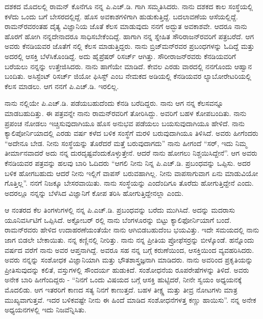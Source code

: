  ದಶಕದ ಮೊದಲಲ್ಲಿ ರಾಮನ್ ಕೊನೆಗೂ ನನ್ನ ಪಿ.ಎಚ್.ಡಿ. ಗಾಗಿ ಸಮ್ಮತಿಸಿದರು. ನಾನು ದಶಕದ ಕಾಲ ಸಂಸ್ಥೆಯಲ್ಲಿ ಕಳೆದು ಒಂದು ಬಗೆ ಬೇಸರದಲ್ಲಿದ್ದೆ. ಹೊಸ ಅವಕಾಶಗಳಿಗಾಗಿ ಹುಡುಕುತ್ತಿದ್ದೆ. ಬದಲಾವಣೆಯ ಆಸೆಯಲ್ಲಿದ್ದೆ. ರಾಮನ್‍ರವರಂತಹ ದೈತ್ಯ ವಿಜ್ಞಾನಿಯ ಜೊತೆ ಕೆಲಸ ಮಾಡುವುದು ನನಗೆ ಅದ್ಭುತ ಅವಕಾಶವೇ. ಆದರೂ ನಾನು ಹೊರಗೆ ಹೋಗಿ ನನ್ನದೇನಾದರೂ ಸಾಧಿಸಬೇಕೆಂದಿದ್ದೆ. ಹಾಗಾಗಿ ನನ್ನ ಸ್ನೇಹಿತ ಸೌರಿರಾಜನ್‍ರವರಿಗೆ ಪತ್ರಬರೆದೆ. ಆಗ ಅವರು ಕೆನಡಿಯವರ ಜೊತೆಗೆ  ನಲ್ಲಿ ಕೆಲಸ ಮಾಡುತ್ತಿದ್ದರು. ನಾನು ಬ್ರಿಜ್‍ಮನ್‍ರವರ ಪ್ರಬಂಧಗಳನ್ನು ಓದಿದ್ದೆ ಮತ್ತು ಅದರಲ್ಲಿ ಆಸಕ್ತಿ ಬೆಳೆಸಿಕೊಂಡಿದ್ದೆ. ಅದು ಹೈಪ್ರೆಷರ್ ರಿಸರ್ಚ್ ಆಗಿತ್ತು. ಸೌರೀರಾಜನ್‍ರವರು ಕೆನಡಿಯವರಿಗೆ ಬರೆಯಲು ನನ್ನನ್ನು ಉತ್ತೇಜಿಸಿದರು. ನಾನು ಹಾಗೆಯೇ ಮಾಡಿದೆ. ಕೇವಲ ಎರಡು ವಾರದಲ್ಲಿ ನನಗೊಂದು ಆಹ್ವಾನ ಬಂದಿತು. ಅಸಿಸ್ಟೆಂಟ್ ರಿಸರ್ಚ್ ಜಿಯೋ ಫಿಸಿಸ್ಟ್ ಎಂಬ ನೇಮಕದ ಅಡಿಯಲ್ಲಿ ಕೆನಡಿಯವರ ಲ್ಯಾಬೋರೇಟರಿಯಲ್ಲಿ ಕೆಲಸ ಮಾಡಲು. ಆಗ ನನಗೆ ಪಿ.ಎಚ್.ಡಿ. ಇರಲಿಲ್ಲ.

ನಾನು  ನಲ್ಲಿಯೇ ಪಿ.ಎಚ್.ಡಿ. ಪಡೆಯಬಹುದೆಂದು ಕೆನಡಿ ಬರೆದಿದ್ದರು. ನಾನು ಆಗ ನನ್ನ ಕೆಲಸವನ್ನೂ ಮಾಡಬಹುದಿತ್ತು. ಈ ಪತ್ರವನ್ನೇ ನಾನು ರಾಮನ್‍ರವರಿಗೆ ತೋರಿಸಿದ್ದು. ಅವರಿಗೆ ಬಹಳ ಕೋಪಬಂದಿತು. ನಾನು ಪ್ರಪಂಚ ನೋಡಲು ಇಚ್ಚಿಸುವುದಾಗಿಯೂ ಹೊಸ ಅನುಭವ ಪಡೆಯಲು ಬಯಸುವುದಾಗಿಯೂ ಹೇಳಿದೆ. ನಾನು ಕ್ಯಾಲಿಪೋರ್ನಿಯಾದಲ್ಲಿ ಎರಡು ವರ್ಷ ಕಳೆದ ಬಳಿಕ ಸಂಸ್ಥೆಗೆ ಮರಳಿ ಬರುವುದಾಗಿಯೂ ತಿಳಿಸಿದೆ. ಅವರು ಹೀಗೆಂದರು “ಅದೇನೂ ಬೇಡ. ನೀನು ಸಂಸ್ಥೆಯನ್ನು ತೊರೆದರೆ ಮತ್ತೆ ಬರುವುದಾಗದು” ನಾನು ಹೀಗಂದೆ “ಸರ್, ಇದು ನಿಮ್ಮ ತೀರ್ಮಾನವಾದರೆ ಅದು ನನ್ನ ದುರದೃಷ್ಟವೆಂದುಕೊಳ್ಳುತ್ತೇನೆ. ಆದರೆ ನಾನು ಹೋಗಲು ನಿಶ್ಚಯಿಸಿದ್ದೇನೆ”. ಆಗ ಅವರು ಕೆನಡಿಯವರ ಪತ್ರವನ್ನು ಹಲವು ಬಾರಿ ಓದಿದರು “ಆಗಲಿ ನೀನು ನಿನ್ನ ಪಿ.ಎಚ್.ಡಿ. ಪ್ರಬಂಧವನ್ನು ಒಪ್ಪಿಸು. ಅದರ ಬಳಿಕ ಹೋಗಬಹುದು ಆದರೆ ನೀನು ಇಲ್ಲಿಗೆ ವಾಪಸ್ ಬರುವಹಾಗಿಲ್ಲ. ನೀನು ವಾಪಸಾಗುವಾಗ ಏನು ಮಾಡುವಿಯೋ ಗೊತ್ತಿಲ್ಲ”. ನನಗೆ ನಿಜಕ್ಕೂ ಬೇಸರವಾಯಿತು. ನಾನು ಸಂಸ್ಥೆಯನ್ನು ಎಂದೆಂದಿಗೂ ತೊರೆದು ಹೋಗುತ್ತಿದ್ದೇನೆ ಎಂದು. ಅದರಲ್ಲೂ ನನ್ನನ್ನು ಬೆಳೆಸಿದ ವಿಜ್ಞಾನಿಗೆ ಕೋಪ ತರಿಸಿ ಹೋಗುತ್ತಿದ್ದೇನಲ್ಲಾ ಎಂದು.

ಆ ನಂತರದ ಕೆಲ ತಿಂಗಳುಗಳಲ್ಲಿ ನನ್ನ ಪಿ.ಎಚ್.ಡಿ. ಪ್ರಬಂಧವನ್ನು ಬರೆದು ಮುಗಿಸಿದೆ. ಅದನ್ನು ಮದರಾಸು ಯೂನಿವರ್ಸಿಟಿಗೆ ಒಪ್ಪಿಸಿದೆ. ಅಕ್ಟೋಬರ್ ರಲ್ಲಿ ನಾನು ಬೆಂಗಳೂರನ್ನು ಬಿಟ್ಟು ಕ್ಯಾಲಿಫೋರ್ನಿಯಾಗೆ ಬಂದೆ. ರಾಮನ್‍ರವರು ಹೇಳಿದ ಉದಾಹರಣೆಯಂತೆಯೇ ನಾನು ಆಗಿಬಿಡಬಹುದೆಂಬ ಭಯವಿತ್ತು. ಇದೇ ಸಮಯದಲ್ಲಿ ನಾನು ಜಾಗ ಬಿಡಲೇ ಬೇಕಾಯಿತು. ನನ್ನ ಕಣ್ಣಿನಲ್ಲಿ ನೀರಿತ್ತು. ನಾನು ನನ್ನ ಪ್ರೀತಿಯ ಪ್ರೋಫೆಸರ್‍ರನ್ನು ಬೀಳ್ಕೊಂಡೆ. ಹನ್ನೊಂದು ವರ್ಷದ ವರೆಗೆ ನಾನು ಅವರ ಆಪ್ತನಾಗಿದ್ದೆ. ಅವರೂ ಸಹ ನನ್ನ ಬಗ್ಗೆ ಕರುಣೆಯಿಂದ, ಆಸಕ್ತಿಯಿಂದ ವ್ಯವಹರಿಸಿದರು. ಅವರು ನನ್ನನ್ನು ಸಂಶೋಧಕ ವಿಜ್ಞಾನಿಯಾಗಿ ಮತ್ತು ಭೌತಶಾಸ್ತ್ರಜ್ಞನಾಗಿ ಮಾಡಿದರು. ನಾನು ಅವರಿಂದ ಪ್ರಕೃತಿಯನ್ನು ಪ್ರೀತಿಸುವುದನ್ನು ಕಲಿತೆ, ವಸ್ತುಗಳಲ್ಲಿ ಸೌಂದರ್ಯ ಹುಡುಕಿದೆ. ಸಂಶೋಧನೆಯ ರೂಪರೇಷೆಗಳನ್ನು ತಿಳಿದೆ. ಅವರು ಅನೇಕ ಬಾರಿ ಹೀಗೆಂದಿದ್ದರು - “ನಿನಗೆ ಒಂದು ವಿಷಯದ ಬಗ್ಗೆ ಆಸಕ್ತಿ ಹುಟ್ಟಿದರೆ, ನೀನೇ ಸ್ವಯಂ ಅಧ್ಯಯನಕ್ಕೆ ಮೊದಲಿಡು. ಆಗ ಇತರರಿಗೆ ಕಾಣದ ಸತ್ಯ ನಿನಗೆ ಕಾಣುತ್ತದೆ. ಬಹಳ ತೀಕ್ಷ್ಣ ಮತ್ತು ತೀವ್ರ ನೋಟಗಳು ಮಾತ್ರ ಮುಖ್ಯವಾಗುತ್ತವೆ. ಇದರ ಬಳಿಕವಷ್ಟೇ ನೀನು ಈ ಹಿಂದೆ ಮಾಡಿದ ಸಂಶೋಧನೆಗಳತ್ತ ಕಣ್ಣು ಹಾಯಿಸು”. ನನ್ನ ಅನೇಕ ಅಧ್ಯಯನಗಳಲ್ಲಿ ಇದು ನಿಜವೆನ್ನಿಸಿತು.

